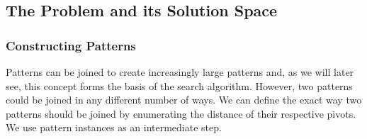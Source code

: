 \documentclass{llncs}
\begin{document}
\begin{comment}
In the example we can see that $G(X)= \tiny\begin{bmatrix}1 & 1 \\[-.2em]\cdot & 1 \\[-.2em]1 & 1\end{bmatrix}$ and that $M(X)=1\ 2\ 1\ 1\ 2$. In fact, because all four patterns have the same geometry, we say that they are \textbf{isomorphic}. As such we write $X \cong Y$ iff $G(X) = G(Y)$. 

To understand the importance of separating the structure and magnitude of patterns, let us briefly expand the example above. Suppose we have a large matrix $B$ that consists of $n$ clusters of matrices $W$ and $X$ from Figure \ref{example3}. To determine the optimal description of $B$, we might want to look at the prevalence of each submatrix. Say it contains $\frac{n}{2}$ $W$'s and $\frac{n}{2}$ $X$'s. In this case it makes sense to include both patterns in the description. However, we could also exploit the fact that the structure of both patterns is equivalent and make the description more concise by only storing $G(W)$ and then $M(W)$ and $M(X)$ separately. Now imagine that $B$ only contains one $W$ and $n-1$ $X$'s. In this case the one $W$ might be an anomaly that we would like to detect. However, it could also be due to noise in the data in which case we would like to describe $B$ just using $n$ $X$'s. It is impossible to make this distinction beforehand. 

One possibility for solving this problem is to let the MDL equation decide whether the stray $W$ is an anomaly or not. Recall that according to the MDL principle the most succinct description is the best. Therefore if the amount of `effort' required to transform $X$ into $W$ is small, we should probably encode that one $W$ using $X$. In that case it is considered noise, while it is probably an anomaly if doing so would yield a larger description.
\end{comment}


\subsection{The Problem and its Solution Space}

\subsubsection{Constructing Patterns}
\label{constructpatterns}
Patterns can be joined to create increasingly large patterns and, as we will later see, this concept forms the basis of the search algorithm. However, two patterns could be joined in any different number of ways. We can define the exact way two patterns should be joined by enumerating the distance of their respective pivots. We use pattern instances as an intermediate step.
\end{document}
